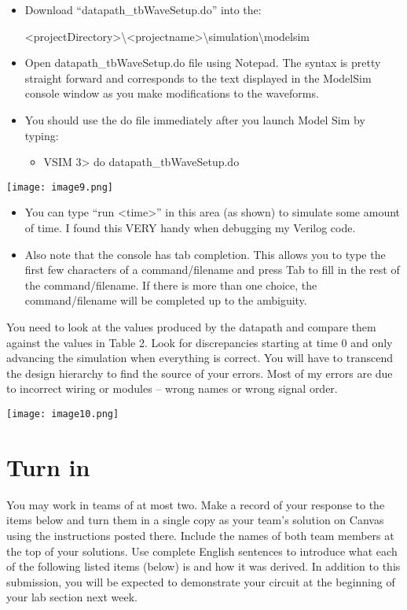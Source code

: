 \begin{itemize}
\item
  Download ``datapath\_tbWaveSetup.do'' into the:
  
  \textless projectDirectory\textgreater\textbackslash\textless projectname\textgreater\textbackslash simulation\textbackslash modelsim
\item
  Open datapath\_tbWaveSetup.do file using Notepad. The syntax is pretty
  straight forward and corresponds to the text displayed in the ModelSim
  console window as you make modifications to the waveforms.
\item
  You should use the do file immediately after you launch Model Sim by
  typing:

  \begin{itemize}
  \item
    VSIM 3\textgreater{} do datapath\_tbWaveSetup.do
  \end{itemize}
\end{itemize}


\texttt{[image:  image9.png]}


\begin{itemize}
\item
  You can type ``run \textless time\textgreater'' in this area (as
  shown) to simulate some amount of time. I found this VERY handy when
  debugging my Verilog code.
\item
  Also note that the console has tab completion. This allows you to type
  the first few characters of a command/filename and press Tab to fill
  in the rest of the command/filename. If there is more than one choice,
  the command/filename will be completed up to the ambiguity.
\end{itemize}

You need to look at the values produced by the datapath and compare them
against the values in Table 2. Look for discrepancies starting at time 0
and only advancing the simulation when everything is correct. You will
have to transcend the design hierarchy to find the source of your
errors. Most of my errors are due to incorrect wiring or modules --
wrong names or wrong signal order.

\texttt{[image:  image10.png]}

\section{Turn in}

You may work in teams of at most two. Make a record of your response to
the items below and turn them in a single copy as your team's solution
on Canvas using the instructions posted there. Include the names of both
team members at the top of your solutions. Use complete English
sentences to introduce what each of the following listed items (below)
is and how it was derived. In addition to this submission, you will be
expected to demonstrate your circuit at the beginning of your lab
section next week.

